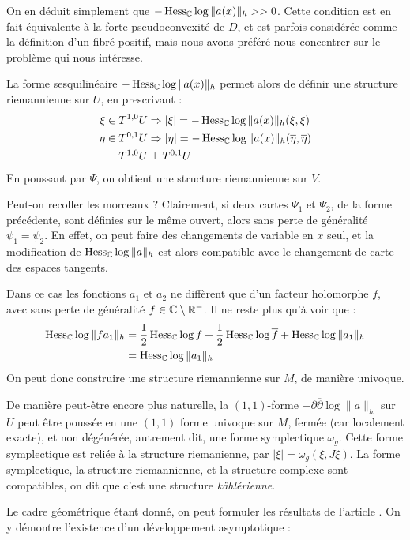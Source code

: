 On en déduit simplement que $-\operatorname{Hess}_{\mathbb{C}} \log \|a(x)\|_h >> 0$. Cette condition est en fait équivalente à la forte pseudoconvexité de $D$, et est parfois considérée comme la définition d'un fibré positif, mais nous avons préféré nous concentrer sur le problème qui nous intéresse.

La forme sesquilinéaire $-\operatorname{Hess}_{\mathbb{C}}\log \|a(x)\|_h$ permet alors de définir une structure riemannienne sur $U$, en prescrivant :
\begin{align*}
	\xi \in T^{1,0}U&\Rightarrow |\xi|=-\operatorname{Hess}_{\mathbb{C}}\log \|a(x)\|_h(\xi,\xi)\\
	\eta \in T^{0,1}U&\Rightarrow |\eta|=-\operatorname{Hess}_{\mathbb{C}}\log \|a(x)\|_h(\overline{\eta},\overline{\eta})\\
	T^{1,0}  U & \perp T^{0,1}U
\end{align*}
En poussant par $\Psi$, on obtient une structure riemannienne sur $V$.

Peut-on recoller les morceaux ? Clairement, si deux cartes $\Psi_1$ et $\Psi_2$, de la forme précédente, sont définies sur le même ouvert, alors sans perte de généralité $\psi_1=\psi_2$. En effet, on peut faire des changements de variable en $x$ seul, et la modification de $\operatorname{Hess}_{\mathbb{C}}\log \|a\|_h$  est alors compatible avec le changement de carte des espaces tangents.

Dans ce cas les fonctions $a_1$ et $a_2$ ne diffèrent que d'un facteur holomorphe $f$, avec sans perte de généralité $f \in \mathbb{C} \setminus \mathbb{R}^-$. Il ne reste plus qu'à voir que :
\begin{align*}
	\operatorname{Hess}_{\mathbb{C}}\log \|fa_1\|_h &= \frac 12 \operatorname{Hess}_{\mathbb{C}} \log f + \frac 12 \operatorname{Hess}_{\mathbb{C}} \log \overline{f} + \operatorname{Hess}_{\mathbb{C}} \log \|a_1\|_h\\
		&= \operatorname{Hess}_{\mathbb{C}} \log \|a_1\|_h
\end{align*}
On peut donc construire une structure riemannienne sur $M$, de manière univoque. 

De manière peut-être encore plus naturelle, la $(1,1)$-forme $-\partial \overline{\partial}\log \|a\|_h$ sur $U$ peut être poussée en une $(1,1)$ forme univoque sur $M$, fermée (car localement exacte), et non dégénérée, autrement dit, une forme symplectique $\omega_g$. Cette forme symplectique est reliée à la structure riemanienne, par $|\xi|=\omega_g(\xi,J\xi)$. La forme symplectique, la structure riemannienne, et la structure complexe sont compatibles, on dit que c'est une structure \emph{kählérienne}.

Le cadre géométrique étant donné, on peut formuler les résultats de l'article \cite{Zelditch2000}. On y démontre l'existence d'un développement asymptotique :

